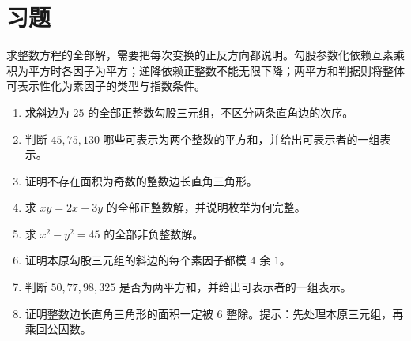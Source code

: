 \section{习题}

求整数方程的全部解，需要把每次变换的正反方向都说明。勾股参数化依赖互素乘积为平方时各因子为平方；递降依赖正整数不能无限下降；两平方和判据则将整体可表示性化为素因子的类型与指数条件。

\begin{enumerate}
 \item 求斜边为 $25$ 的全部正整数勾股三元组，不区分两条直角边的次序。
 \item 判断 $45,75,130$ 哪些可表示为两个整数的平方和，并给出可表示者的一组表示。
 \item 证明不存在面积为奇数的整数边长直角三角形。
 \item 求 $xy=2x+3y$ 的全部正整数解，并说明枚举为何完整。
 \item\label{ex:dio-factors} 求 $x^2-y^2=45$ 的全部非负整数解。
 \item\label{ex:dio-hypotenuse} 证明本原勾股三元组的斜边的每个素因子都模 $4$ 余 $1$。
 \item\label{ex:dio-two-square-list} 判断 $50,77,98,325$ 是否为两平方和，并给出可表示者的一组表示。
 \item\label{ex:dio-area} 证明整数边长直角三角形的面积一定被 $6$ 整除。提示：先处理本原三元组，再乘回公因数。
\end{enumerate}

